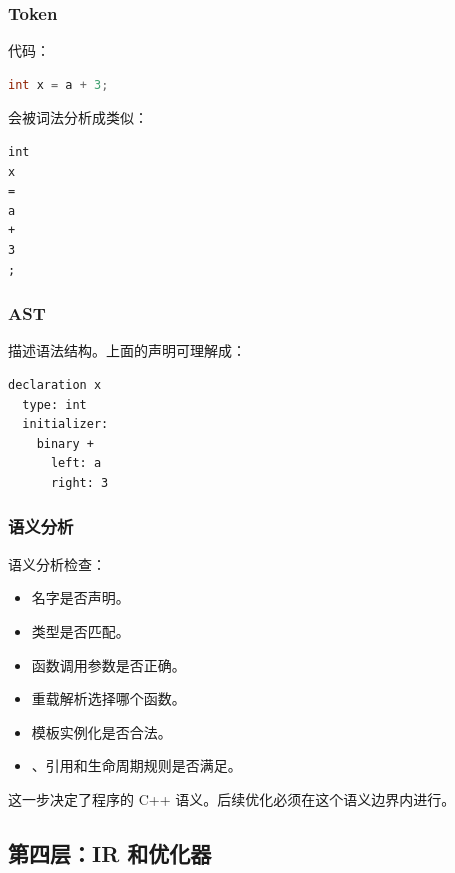 \subsubsection{Token}

代码：

\begin{lstlisting}[language=C++]
int x = a + 3;
\end{lstlisting}

会被词法分析成类似：

\begin{center}
\begin{verbatim}
int
x
=
a
+
3
;
\end{verbatim}
\end{center}

\subsubsection{AST}

 描述语法结构。上面的声明可理解成：

\begin{center}
\begin{minipage}{0.68\linewidth}
\begin{verbatim}
declaration x
  type: int
  initializer:
    binary +
      left: a
      right: 3
\end{verbatim}
\end{minipage}
\end{center}

\subsubsection{语义分析}

语义分析检查：

\begin{itemize}
  \item 名字是否声明。
  \item 类型是否匹配。
  \item 函数调用参数是否正确。
  \item 重载解析选择哪个函数。
  \item 模板实例化是否合法。
  \item {}、引用和生命周期规则是否满足。
\end{itemize}

这一步决定了程序的 C++ 语义。后续优化必须在这个语义边界内进行。

\subsection{第四层：IR 和优化器}

